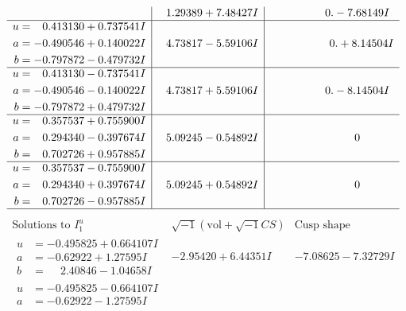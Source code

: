 \documentclass[1p]{elsarticle_modified}
\theoremstyle{definition}
\newcommand{\I}{\sqrt{-1}}
\begin{document}
$$\begin{array}{c|c|c}
 & \phantom{-}1.29389 + 7.48427 I & \phantom{-0.000000 } 0. - 7.68149 I \\ \hline\begin{aligned}
u &= \phantom{-}0.413130 + 0.737541 I \\
a &= -0.490546 + 0.140022 I \\
b &= -0.797872 - 0.479732 I\end{aligned}
 & \phantom{-}4.73817 - 5.59106 I & \phantom{-0.000000 -}0. + 8.14504 I \\ \hline\begin{aligned}
u &= \phantom{-}0.413130 - 0.737541 I \\
a &= -0.490546 - 0.140022 I \\
b &= -0.797872 + 0.479732 I\end{aligned}
 & \phantom{-}4.73817 + 5.59106 I & \phantom{-0.000000 } 0. - 8.14504 I \\ \hline\begin{aligned}
u &= \phantom{-}0.357537 + 0.755900 I \\
a &= \phantom{-}0.294340 - 0.397674 I \\
b &= \phantom{-}0.702726 + 0.957885 I\end{aligned}
 & \phantom{-}5.09245 - 0.54892 I & \phantom{-0.000000 } 0 \\ \hline\begin{aligned}
u &= \phantom{-}0.357537 - 0.755900 I \\
a &= \phantom{-}0.294340 + 0.397674 I \\
b &= \phantom{-}0.702726 - 0.957885 I\end{aligned}
 & \phantom{-}5.09245 + 0.54892 I & \phantom{-0.000000 } 0\\
 \hline 
 \end{array}$$\newpage$$\begin{array}{c|c|c}  
\text{Solutions to }I^u_{1}& \I (\text{vol} + \sqrt{-1}CS) & \text{Cusp shape}\\
 \hline 
\begin{aligned}
u &= -0.495825 + 0.664107 I \\
a &= -0.62922 + 1.27595 I \\
b &= \phantom{-}2.40846 - 1.04658 I\end{aligned}
 & -2.95420 + 6.44351 I & -7.08625 - 7.32729 I \\ \hline\begin{aligned}
u &= -0.495825 - 0.664107 I \\
a &= -0.62922 - 1.27595 I \\

\end{aligned}
\end{array}$$
\end{document}
